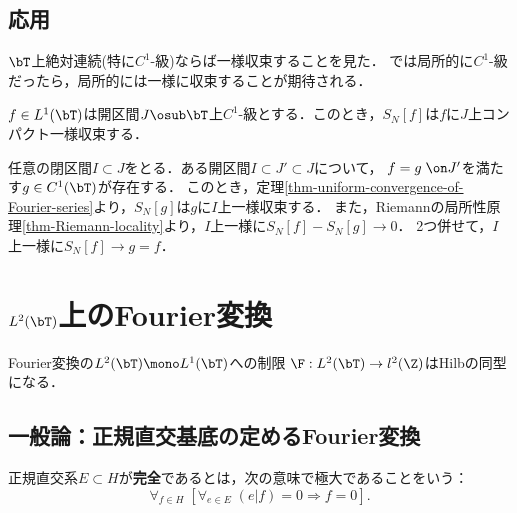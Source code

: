 \documentclass[uplatex,dvipdfmx]{jsreport}
\begin{document}
\subsection{応用}

\begin{tcolorbox}[colframe=ForestGreen, colback=ForestGreen!10!white,breakable,colbacktitle=ForestGreen!40!white,coltitle=black,fonttitle=\bfseries\sffamily,
title=]
    $\bT$上絶対連続(特に$C^1$-級)ならば一様収束することを見た．
    では局所的に$C^1$-級だったら，局所的には一様に収束することが期待される．
\end{tcolorbox}

\begin{corollary}[局所化された一様収束原理]\label{cor-Riemann-locality}
    $f\in L^1(\bT)$は開区間$J\osub\bT$上$C^1$-級とする．このとき，$S_N[f]$は$f$に$J$上コンパクト一様収束する．
\end{corollary}
\begin{Proof}
    任意の閉区間$I\subset J$をとる．ある開区間$I\subset J'\subset J$について，
    $f=g\;\on J'$を満たす$g\in C^1(\bT)$が存在する．
    このとき，定理\ref{thm-uniform-convergence-of-Fourier-series}より，$S_N[g]$は$g$に$I$上一様収束する．
    また，Riemannの局所性原理\ref{thm-Riemann-locality}より，$I$上一様に$S_N[f]-S_N[g]\to0$．
    2つ併せて，$I$上一様に$S_N[f]\to g=f$．
\end{Proof}

\section{$L^2(\bT)$上のFourier変換}

\begin{tcolorbox}[colframe=ForestGreen, colback=ForestGreen!10!white,breakable,colbacktitle=ForestGreen!40!white,coltitle=black,fonttitle=\bfseries\sffamily,
title=]
    Fourier変換の$L^2(\bT)\mono L^1(\bT)$への制限
    $\F:L^2(\bT)\to l^2(\Z)$はHilbの同型になる．
\end{tcolorbox}

\subsection{一般論：正規直交基底の定めるFourier変換}

\begin{definition}[CONS]
    正規直交系$E\subset H$が\textbf{完全}であるとは，次の意味で極大であることをいう：
    \[\forall_{f\in H}\;[\forall_{e\in E}\;(e|f)=0\Rightarrow f=0].\]
\end{definition}
\end{document}
